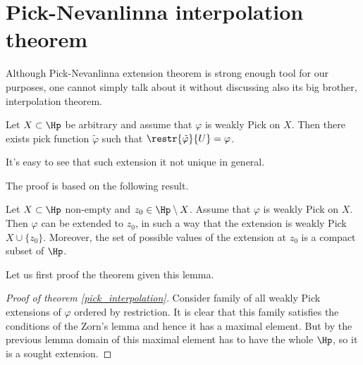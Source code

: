\section{Pick-Nevanlinna interpolation theorem}

Although Pick-Nevanlinna extension theorem is strong enough tool for our purposes, one cannot simply talk about it without discussing also its big brother, interpolation theorem.

\begin{lause}\label{pick_interpolation}
	Let $X \subset \Hp$ be arbitrary and assume that $\varphi$ is weakly Pick on $X$. Then there exists pick function $\tilde{\varphi}$ such that $\restr{\tilde{\varphi}}{U} = \varphi$.
\end{lause}

It's easy to see that such extension it not unique in general.

The proof is based on the following result.

\begin{lem}\label{pick_extension_lemma}
	Let $X \subset \Hp$ non-empty and $z_{0} \in \Hp \setminus X$. Assume that $\varphi$ is weakly Pick on $X$. Then $\varphi$ can be extended to $z_{0}$, in such a way that the extension is weakly Pick $X \cup \{z_{0}\}$. Moreover, the set of possible values of the extension at $z_{0}$ is a compact subset of $\Hp$.
\end{lem}

Let us first proof the theorem given this lemma.

\begin{proof}[Proof of theorem \ref{pick_interpolation}]
	Consider family of all weakly Pick extensions of $\varphi$ ordered by restriction. It is clear that this family satisfies the conditions of the Zorn's lemma and hence it has a maximal element. But by the previous lemma domain of this maximal element has to have the whole $\Hp$, so it is a sought extension.
\end{proof}

